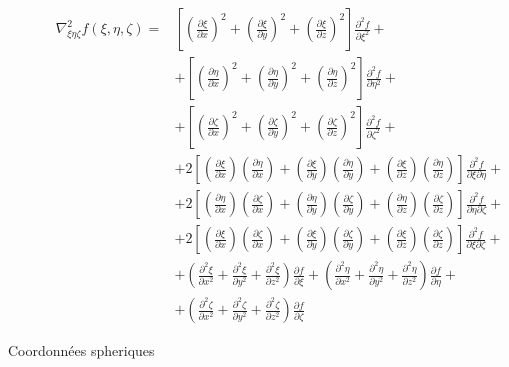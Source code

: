 \documentclass
[
a4paper,                      %
twoside,					  %
12pt,                         %
abstract,		      %
fleqn,                        %
]
{scrartcl} %
\begin{document}
\begin{description}
\begin{equation}
\begin{aligned}
\nabla_{\xi\eta\zeta}^{2}f\left(\xi,\eta,\zeta\right)=&\left[\left(\frac{\partial\xi}{\partial x}\right)^{2}+\left(\frac{\partial\xi}{\partial y}\right)^{2}+\left(\frac{\partial\xi}{\partial z}\right)^{2}\right]\frac{\partial^{2} f}{\partial\xi^{2}}+\\[5pt]
&+\left[\left(\frac{\partial\eta}{\partial x}\right)^{2}+\left(\frac{\partial\eta}{\partial y}\right)^{2}+\left(\frac{\partial\eta}{\partial z}\right)^{2}\right]\frac{\partial^{2} f}{\partial\eta^{2}}+\\[5pt]
&+\left[\left(\frac{\partial\zeta}{\partial x}\right)^{2}+\left(\frac{\partial\zeta}{\partial y}\right)^{2}+\left(\frac{\partial\zeta}{\partial z}\right)^{2}\right]\frac{\partial^{2} f}{\partial\zeta^{2}}+\\[5pt]
&+2\left[\left(\frac{\partial\xi}{\partial x}\right)\left(\frac{\partial\eta}{\partial x}\right)+\left(\frac{\partial\xi}{\partial y}\right)\left(\frac{\partial\eta}{\partial y}\right)+\left(\frac{\partial\xi}{\partial z}\right)\left(\frac{\partial\eta}{\partial z}\right)\right]\frac{\partial^{2} f}{\partial\xi\partial\eta}+\\[5pt]
&+2\left[\left(\frac{\partial\eta}{\partial x}\right)\left(\frac{\partial\zeta}{\partial x}\right)+\left(\frac{\partial\eta}{\partial y}\right)\left(\frac{\partial\zeta}{\partial y}\right)+\left(\frac{\partial\eta}{\partial z}\right)\left(\frac{\partial\zeta}{\partial z}\right)\right]\frac{\partial^{2} f}{\partial\eta\partial\zeta}+\\[5pt]
&+2\left[\left(\frac{\partial\xi}{\partial x}\right)\left(\frac{\partial\zeta}{\partial x}\right)+\left(\frac{\partial\xi}{\partial y}\right)\left(\frac{\partial\zeta}{\partial y}\right)+\left(\frac{\partial\xi}{\partial z}\right)\left(\frac{\partial\zeta}{\partial z}\right)\right]\frac{\partial^{2} f}{\partial\xi\partial\zeta}+\\[5pt]
&+\left(\frac{\partial^{2}\xi}{\partial x^{2}}+\frac{\partial^{2}\xi}{\partial y^{2}}+\frac{\partial^{2}\xi}{\partial z^{2}}\right)\frac{\partial f}{\partial\xi}+\left(\frac{\partial^{2}\eta}{\partial x^{2}}+\frac{\partial^{2}\eta}{\partial y^{2}}+\frac{\partial^{2}\eta}{\partial z^{2}}\right)\frac{\partial f}{\partial\eta}+\\[5pt]
&+\left(\frac{\partial^{2}\zeta}{\partial x^{2}}+\frac{\partial^{2}\zeta}{\partial y^{2}}+\frac{\partial^{2}\zeta}{\partial z^{2}}\right)\frac{\partial f}{\partial\zeta}
\end{aligned}
\end{equation}

\item[Coordonn\'ees spheriques]
\end{description}
\end{document}
